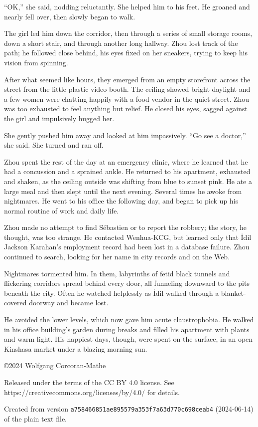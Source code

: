 \documentclass[10pt,b5paper]{article}
\begin{document}
``OK,'' she said, nodding reluctantly. She helped him to his feet. He
groaned and nearly fell over, then slowly began to walk.

The girl led him down the corridor, then through a series of small
storage rooms, down a short stair, and through another long hallway.
Zhou lost track of the path; he followed close behind, his eyes
fixed on her sneakers, trying to keep his vision from spinning.

After what seemed like hours, they emerged from an empty storefront
across the street from the little plastic video booth. The ceiling
showed bright daylight and a few women were chatting happily with
a food vendor in the quiet street. Zhou was too exhausted to feel
anything but relief. He closed his eyes, sagged against the girl
and impulsively hugged her.

She gently pushed him away and looked at him impassively. ``Go see
a doctor,'' she said. She turned and ran off.

\bigskip

Zhou spent the rest of the day at an emergency clinic, where he
learned that he had a concussion and a sprained ankle. He returned
to his apartment, exhausted and shaken, as the ceiling outside was
shifting from blue to sunset pink. He ate a large meal and then slept
until the next evening. Several times he awoke from nightmares.
He went to his office the following day, and began to pick up his
normal routine of work and daily life.

Zhou made no attempt to find S\'{e}bastien or to report the robbery;
the story, he thought, was too strange. He contacted Wenhua-KCG,
but learned only that \.{I}dil Jackson Karahan's employment record
had been lost in a database failure. Zhou continued to search,
looking for her name in city records and on the Web.

Nightmares tormented him. In them, labyrinths of fetid black tunnels
and flickering corridors spread behind every door, all funneling
downward to the pits beneath the city. Often he watched helplessly
as \.{I}dil walked through a blanket-covered doorway and became lost.

He avoided the lower levels, which now gave him acute claustrophobia.
He walked in his office building's garden during breaks and filled
his apartment with plants and warm light. His happiest days, though,
were spent on the surface, in an open Kinshasa market under a
blazing morning sun.

\vfill
\begin{flushleft}
\setlength{\parskip}{\baselineskip}
\copyright 2024 Wolfgang Corcoran-Mathe

Released under the terms of the CC BY 4.0 license. See
https://creativecommons.org/licenses/by/4.0/ for details.

Created from version
\texttt{a758466851ae895579a353f7a63d770c698ceab4} (2024-06-14) of the
plain text file.
\end{flushleft}
\end{document}
